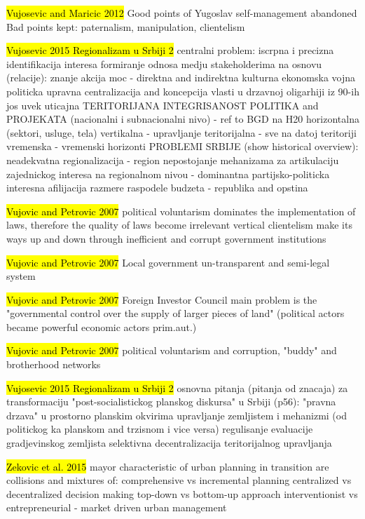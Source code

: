 \documentclass[11pt]{report}
\begin{document}
\hl{Vujosevic and Maricic 2012}
Good points of Yugoslav self-management abandoned
Bad points kept: paternalism, manipulation, clientelism

\hl{Vujosevic 2015 Regionalizam u Srbiji 2}
centralni problem: iscrpna i precizna identifikacija interesa
formiranje odnosa medju stakeholderima na osnovu (relacije):
    znanje
    akcija
    moc - direktna and indirektna
        kulturna
        ekonomska
        vojna
        politicka
upravna centralizacija and koncepcija vlasti u drzavnoj oligarhiji iz 90-ih jos uvek uticajna
TERITORIJANA INTEGRISANOST POLITIKA and PROJEKATA (nacionalni i subnacionalni nivo) - ref to BGD na H20
    horizontalna (sektori, usluge, tela)
    vertikalna - upravljanje
    teritorijalna - sve na datoj teritoriji
    vremenska - vremenski horizonti
PROBLEMI SRBIJE (show historical overview):
    neadekvatna regionalizacija  - region
    nepostojanje mehanizama za artikulaciju zajednickog interesa na regionalnom nivou - dominantna partijsko-politicka interesna afilijacija
    razmere raspodele budzeta - republika and opstina

\hl{Vujovic and Petrovic 2007}
political voluntarism dominates the implementation of laws, therefore the quality of laws become irrelevant
vertical clientelism make its ways up and down through inefficient and corrupt government institutions

\hl{Vujovic and Petrovic 2007}
Local government un-transparent and semi-legal system 

\hl{Vujovic and Petrovic 2007}
	Foreign Investor Council
main problem is the "governmental control over the supply of larger pieces of land" (political actors became powerful economic actors prim.aut.)

\hl{Vujovic and Petrovic 2007}
political voluntarism and corruption, "buddy" and brotherhood networks

\hl{Vujosevic 2015 Regionalizam u Srbiji 2}
osnovna pitanja (pitanja od znacaja) za transformaciju "post-socialistickog planskog diskursa" u Srbiji (p56):
    "pravna drzava" u prostorno planskim okvirima
    upravljanje zemljistem i mehanizmi (od politickog ka planskom and trzisnom i vice versa)
    regulisanje evaluacije gradjevinskog zemljista
    selektivna decentralizacija teritorijalnog upravljanja

\hl{Zekovic et al. 2015}
mayor characteristic of urban planning in transition are collisions and mixtures of:
    comprehensive vs incremental planning
    centralized vs decentralized decision making
    top-down vs bottom-up approach
    interventionist vs entrepreneurial - market driven urban management
    
\end{document}
